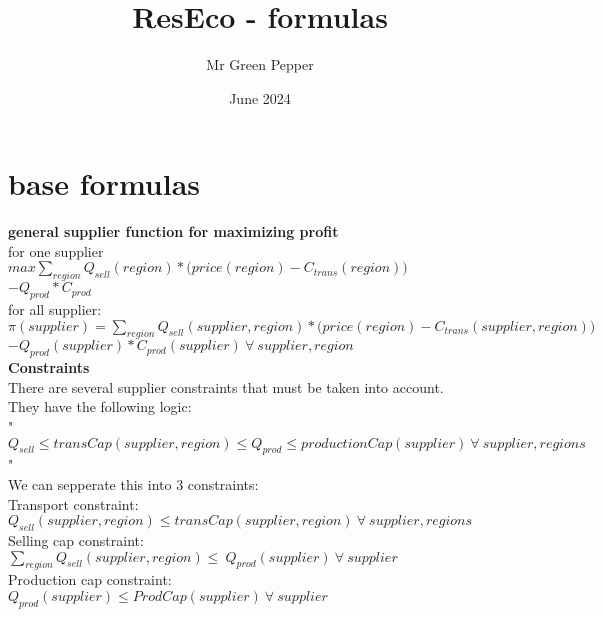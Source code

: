 \documentclass{article}
\title{ResEco - formulas}
\author{Mr Green Pepper}
\date{June 2024}
\begin{document}
\maketitle

\section{base formulas}
\textbf{general supplier function for maximizing profit}\\
for one  supplier\\
$max \sum_{region} Q_{sell}(region) *\Big(price(region) - C_{trans}(region)\Big) $\\
$- Q_{prod}*C_{prod}$\\
for all supplier:\\
$\pi(supplier) = \sum_{region} Q_{sell}(supplier, region) *\Big(price(region) - C_{trans}(supplier,region)\Big) $\\
$- Q_{prod}(supplier)*C_{prod}(supplier)\: \forall \:supplier,region$\\

\textbf{Constraints}\\
There are several supplier constraints that must be taken into account.\\
They have the following logic:\\
"$Q_{sell} \leq transCap(supplier, region) \leq Q_{prod} \leq productionCap(supplier) \: \forall \: supplier,regions$"\\
We can sepperate this into 3 constraints:\\


Transport constraint:\\
\quad$Q_{sell}(supplier, region) \leq transCap(supplier, region)\: \forall \: supplier,regions$\\
Selling cap constraint:\\
\quad$\sum_{region} Q_{sell}(supplier, region) \leq\ Q_{prod}(supplier)\:\forall \: supplier $\\
Production cap constraint:\\
\quad$Q_{prod}(supplier) \leq ProdCap(supplier)\:\forall \: supplier$\\

\hfill
\end{document}
